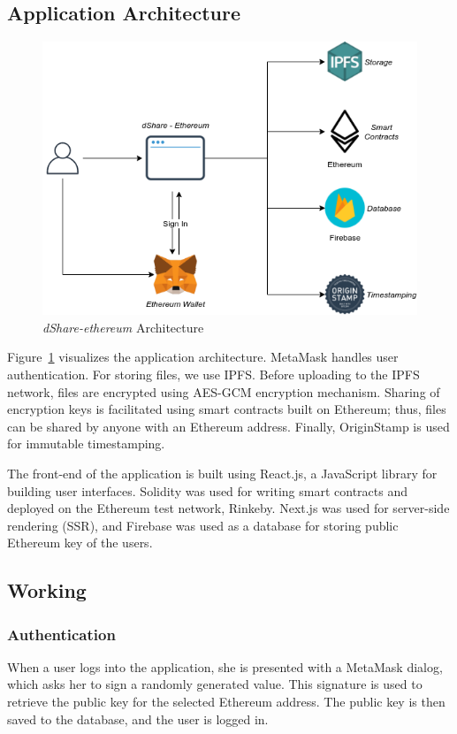 \subsection{Application Architecture}

\begin{figure}[h]
	\includegraphics[width=\linewidth]{figures/dshare-ethereum}
	\caption{\label{fig:dshare-ethereum} \textit{dShare-ethereum} Architecture}
\end{figure}

Figure~\ref{fig:dshare-ethereum} visualizes the application architecture. MetaMask handles user authentication. For storing files, we use IPFS. Before uploading to the IPFS network, files are encrypted using AES-GCM\cite{web:aesgcm:1} encryption mechanism. Sharing of encryption keys is facilitated using smart contracts built on Ethereum; thus, files can be shared by anyone with an Ethereum address. Finally, OriginStamp is used for immutable timestamping.

The front-end of the application is built using React.js\cite{web:react:1}, a JavaScript library for building user interfaces. Solidity was used for writing smart contracts and deployed on the Ethereum test network, Rinkeby\cite{web:rinkeby:1}. Next.js\cite{web:next:1} was used for server-side rendering (SSR), and Firebase was used as a database for storing public Ethereum key of the users.

\subsection{Working}
\subsubsection{Authentication}
When a user logs into the application, she is presented with a MetaMask dialog, which asks her to sign a randomly generated value. This signature is used to retrieve the public key for the selected Ethereum address. The public key is then saved to the database, and the user is logged in.

